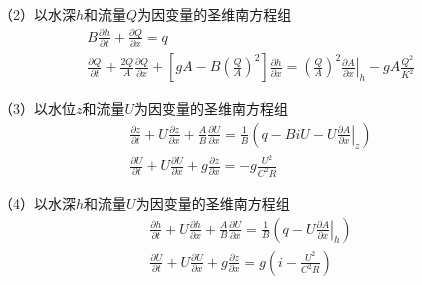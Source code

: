 （2）以水深$h$和流量$Q$为因变量的圣维南方程组
\begin{equation}
  \begin{gathered}
    B\frac{\partial h}{\partial t}
    +
    \frac{\partial Q}{\partial x}
    =
    q
    \\
    \frac{\partial Q}{\partial t}
    +
    \frac{2Q}{A}\frac{\partial Q}{\partial x}
    +
    \left[
      gA -
      B
      \left(
      \frac{Q}{A}
      \right)^{2}
    \right]
    \frac{\partial h}{\partial x}
    =
    \left(
    \frac{Q}{A}
    \right)^{2}
    \left.
    \frac{\partial A}{\partial x}
    \right|_{h}
    -
    gA\frac{Q^{2}}{K^{2}}
  \end{gathered}
  \label{EqCGe_SV_hQ}
\end{equation}



（3）以水位$z$和流量$U$为因变量的圣维南方程组
\begin{equation}
  \begin{gathered}
    \frac{\partial z}{\partial t}
    +
    U\frac{\partial z}{\partial x}
    +
    \frac{A}{B}\frac{\partial U}{\partial x}
    =
    \frac{1}{B}
    \left(
    q - BiU - U\left.\frac{\partial A}{\partial x}\right|_{z}
    \right)
    \\
    \frac{\partial U}{\partial t}
    +
    U\frac{\partial U}{\partial x}
    +
    g\frac{\partial z}{\partial x}
    =
    -g\frac{U^{2}}{C^{2}R}
  \end{gathered}
  \label{EqCGe_SV_zU}
\end{equation}

（4）以水深$h$和流量$U$为因变量的圣维南方程组
\begin{equation}
  \begin{gathered}
    \frac{\partial h}{\partial t}
    +
    U\frac{\partial h}{\partial x}
    +
    \frac{A}{B}\frac{\partial U}{\partial x}
    =
    \frac{1}{B}
    \left(
    q - U\left.\frac{\partial A}{\partial x}\right|_{h}
    \right)
    \\
    \frac{\partial U}{\partial t}
    +
    U\frac{\partial U}{\partial x}
    +
    g\frac{\partial z}{\partial x}
    =
    g
    \left(
    i-\frac{U^{2}}{C^{2}R}
    \right)
  \end{gathered}
  \label{EqCGe_SV_hU}
\end{equation}

